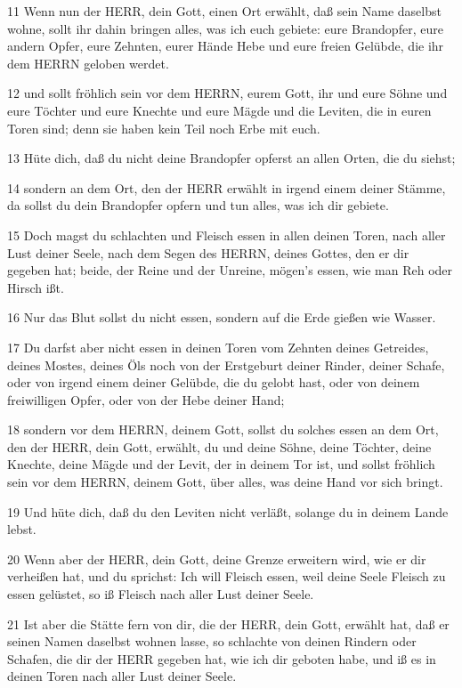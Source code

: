 \par 11 Wenn nun der HERR, dein Gott, einen Ort erwählt, daß sein Name daselbst wohne, sollt ihr dahin bringen alles, was ich euch gebiete: eure Brandopfer, eure andern Opfer, eure Zehnten, eurer Hände Hebe und eure freien Gelübde, die ihr dem HERRN geloben werdet.
\par 12 und sollt fröhlich sein vor dem HERRN, eurem Gott, ihr und eure Söhne und eure Töchter und eure Knechte und eure Mägde und die Leviten, die in euren Toren sind; denn sie haben kein Teil noch Erbe mit euch.
\par 13 Hüte dich, daß du nicht deine Brandopfer opferst an allen Orten, die du siehst;
\par 14 sondern an dem Ort, den der HERR erwählt in irgend einem deiner Stämme, da sollst du dein Brandopfer opfern und tun alles, was ich dir gebiete.
\par 15 Doch magst du schlachten und Fleisch essen in allen deinen Toren, nach aller Lust deiner Seele, nach dem Segen des HERRN, deines Gottes, den er dir gegeben hat; beide, der Reine und der Unreine, mögen's essen, wie man Reh oder Hirsch ißt.
\par 16 Nur das Blut sollst du nicht essen, sondern auf die Erde gießen wie Wasser.
\par 17 Du darfst aber nicht essen in deinen Toren vom Zehnten deines Getreides, deines Mostes, deines Öls noch von der Erstgeburt deiner Rinder, deiner Schafe, oder von irgend einem deiner Gelübde, die du gelobt hast, oder von deinem freiwilligen Opfer, oder von der Hebe deiner Hand;
\par 18 sondern vor dem HERRN, deinem Gott, sollst du solches essen an dem Ort, den der HERR, dein Gott, erwählt, du und deine Söhne, deine Töchter, deine Knechte, deine Mägde und der Levit, der in deinem Tor ist, und sollst fröhlich sein vor dem HERRN, deinem Gott, über alles, was deine Hand vor sich bringt.
\par 19 Und hüte dich, daß du den Leviten nicht verläßt, solange du in deinem Lande lebst.
\par 20 Wenn aber der HERR, dein Gott, deine Grenze erweitern wird, wie er dir verheißen hat, und du sprichst: Ich will Fleisch essen, weil deine Seele Fleisch zu essen gelüstet, so iß Fleisch nach aller Lust deiner Seele.
\par 21 Ist aber die Stätte fern von dir, die der HERR, dein Gott, erwählt hat, daß er seinen Namen daselbst wohnen lasse, so schlachte von deinen Rindern oder Schafen, die dir der HERR gegeben hat, wie ich dir geboten habe, und iß es in deinen Toren nach aller Lust deiner Seele.
